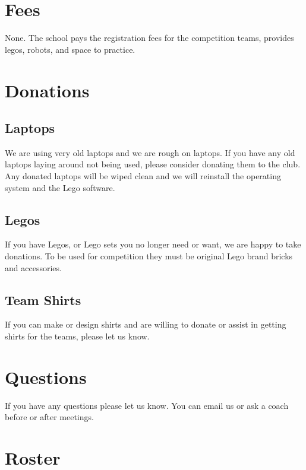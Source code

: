 \documentclass[letter]{article}
\begin{document}
\section{Fees}

None.  The school pays the registration fees for the competition teams, provides legos, robots, and space to practice.

\hypertarget{donations}{%
\section{Donations}\label{donations}}

\subsection{Laptops}

We are using very old laptops and we are rough on laptops.  If you have any old laptops laying around not being used, please consider donating them to the club.  Any donated laptops will be wiped clean and we will reinstall the operating system and the Lego software.

\subsection{Legos}

If you have Legos, or Lego sets you no longer need or want, we are happy to take donations.  To be used for competition they must be original Lego brand bricks and accessories.

\subsection{Team Shirts}

If you can make or design shirts and are willing to donate or assist in getting shirts for the teams, please let us know.

\section{Questions}

If you have any questions please let us know. You can email us or ask a coach
before or after meetings.

\clearpage

\section{Roster}
\end{document}
